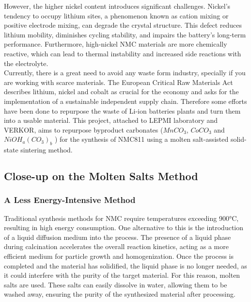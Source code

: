 \documentclass{article}
\begin{document}
However, the higher nickel content introduces significant challenges. Nickel's tendency to occupy lithium sites, a phenomenon known as cation mixing or positive electrode mixing, can degrade the crystal structure. This defect reduces lithium mobility, diminishes cycling stability, and impairs the battery's long-term performance. Furthermore, high-nickel NMC materials are more chemically reactive, which can lead to thermal instability and increased side reactions with the electrolyte.\cite{NMCintro} \\

Currently, there is a great need to avoid any waste form industry,
specially if you are working with scarce materials. The European Critical Raw Materials Act describes lithium, nickel and cobalt as crucial for the economy and asks for the implementation of a sustainable independent supply chain.\cite{RMA} Therefore some efforts
have been done to repurpose the waste of Li-ion batteries plants and turn them into a usable material. This project, attached to LEPMI laboratory and VERKOR, aims to repurpose byproduct carbonates (\({MnCO}_{3}\), \({CoCO}_{3}\) and \({NiOH}_{a}{({CO}_{3})}_{b}\) ) for the synthesis of NMC811 using a molten salt-assisted solid-state sintering method. \\


\subsection{Close-up on the Molten Salts Method}

\subsubsection{A Less Energy-Intensive Method}
Traditional synthesis methods for NMC require temperatures exceeding 900°C, resulting in high energy consumption. One alternative to this is the introduction of a liquid diffusion medium into the process. The presence of a liquid phase during calcination accelerates the overall reaction kinetics, acting as a more efficient medium for particle growth and homogenization. Once the process is completed and the material has solidified, the liquid phase is no longer needed, as it could interfere with the purity of the target material. For this reason, molten salts are used. These salts can easily dissolve in water, allowing them to be washed away, ensuring the purity of the synthesized material after processing.\cite{Heuristics}
\end{document}

